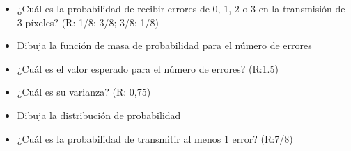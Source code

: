 \documentclass[
]{book}
\begin{document}
\begin{itemize}
\item
  ¿Cuál es la probabilidad de recibir errores de \(0\), \(1\), \(2\) o \(3\) en la transmisión de \(3\) píxeles? (R: 1/8; 3/8; 3/8; 1/8)
\item
  Dibuja la función de masa de probabilidad para el número de errores
\item
  ¿Cuál es el valor esperado para el número de errores? (R:1.5)
\item
  ¿Cuál es su varianza? (R: 0,75)
\item
  Dibuja la distribución de probabilidad
\item
  ¿Cuál es la probabilidad de transmitir al menos 1 error? (R:7/8)
\end{itemize}

  
\end{document}
